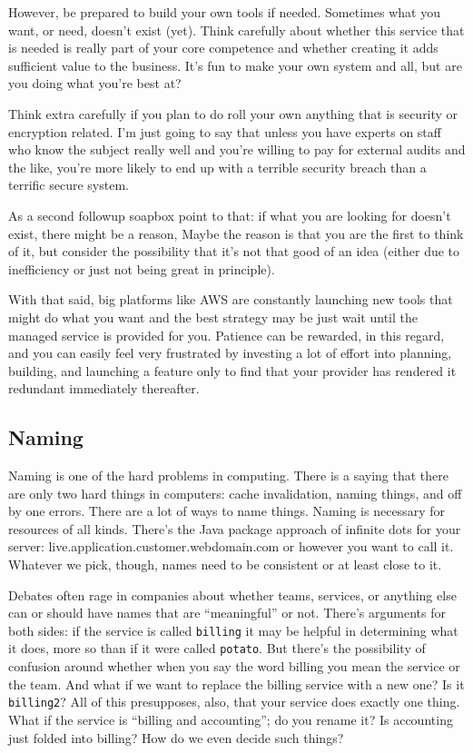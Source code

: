 However, be prepared to build your own tools if needed. Sometimes what you want, or need, doesn't exist (yet). Think carefully about whether this service that is needed is really part of your core competence and whether creating it adds sufficient value to the business. It's fun to make your own system and all, but are you doing what you're best at? 

Think extra carefully if you plan to do roll your own anything that is security or encryption related. I'm just going to say that unless you have experts on staff who know the subject really well and you're willing to pay for external audits and the like, you're more likely to end up with a terrible security breach than a terrific secure system. 

As a second followup soapbox point to that: if what you are looking for doesn't exist, there might be a reason, Maybe the reason is that you are the first to think of it, but consider the possibility that it's not that good of an idea (either due to inefficiency or just not being great in principle). 

With that said, big platforms like AWS are constantly launching new tools that might do what you want and the best strategy may be just wait until the managed service is provided for you. Patience can be rewarded, in this regard, and you can easily feel very frustrated by investing a lot of effort into planning, building, and launching a feature only to find that your provider has rendered it redundant immediately thereafter.

\subsection*{Naming}
Naming is one of the hard problems in computing. There is a saying that there are only two hard things in computers: cache invalidation, naming things, and off by one errors.  There are a
lot of ways to name things. Naming is necessary for resources of all kinds. There's the Java package approach of infinite dots for your server: live.application.customer.webdomain.com or however you want to call it. Whatever we pick, though, names need to be consistent or at least close to it.

Debates often rage in companies about whether teams, services, or anything else can or should have names that are ``meaningful'' or not. There's arguments for both sides: if the service is called \texttt{billing} it may be helpful in determining what it does, more so than if it were called \texttt{potato}. But there's the possibility of confusion around whether when you say the word billing you mean the service or the team. And what if we want to replace the billing service with a new one? Is it \texttt{billing2}? All of this presupposes, also, that your service does exactly one thing. What if the service is ``billing and accounting''; do you rename it? Is accounting just folded into billing? How do we even decide such things? 

